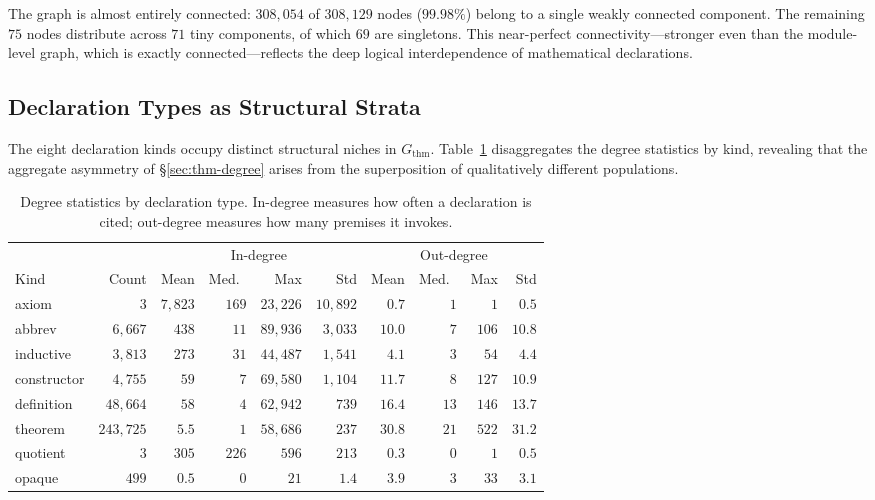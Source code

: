 The graph is almost entirely connected: $308{,}054$ of $308{,}129$ nodes ($99.98\%$) belong to a single weakly connected component. The remaining $75$ nodes distribute across $71$ tiny components, of which $69$ are singletons. This near-perfect connectivity---stronger even than the module-level graph, which is exactly connected---reflects the deep logical interdependence of mathematical declarations.

\subsection{Declaration Types as Structural Strata}
\label{sec:thm-types}

The eight declaration kinds occupy distinct structural niches in $G_{\mathrm{thm}}$. Table~\ref{tab:thm-kind-degree} disaggregates the degree statistics by kind, revealing that the aggregate asymmetry of \S\ref{sec:thm-degree} arises from the superposition of qualitatively different populations.

\begin{table}[ht]
\centering
\caption{Degree statistics by declaration type. In-degree measures how often a declaration is cited; out-degree measures how many premises it invokes.}
\label{tab:thm-kind-degree}
\small
\begin{tabular}{lrrrrrrrrr}
\toprule
& & \multicolumn{4}{c}{In-degree} & \multicolumn{4}{c}{Out-degree} \\
\cmidrule(lr){3-6} \cmidrule(lr){7-10}
Kind & Count & Mean & Med.\ & Max & Std & Mean & Med.\ & Max & Std \\
\midrule
axiom       & $3$       & $7{,}823$ & $169$ & $23{,}226$ & $10{,}892$ & $0.7$ & $1$ & $1$ & $0.5$ \\
abbrev      & $6{,}667$ & $438$     & $11$  & $89{,}936$ & $3{,}033$  & $10.0$ & $7$ & $106$ & $10.8$ \\
inductive   & $3{,}813$ & $273$     & $31$  & $44{,}487$ & $1{,}541$  & $4.1$ & $3$ & $54$ & $4.4$ \\
constructor & $4{,}755$ & $59$      & $7$   & $69{,}580$ & $1{,}104$  & $11.7$ & $8$ & $127$ & $10.9$ \\
definition  & $48{,}664$& $58$      & $4$   & $62{,}942$ & $739$      & $16.4$ & $13$ & $146$ & $13.7$ \\
theorem     & $243{,}725$& $5.5$   & $1$   & $58{,}686$ & $237$      & $30.8$ & $21$ & $522$ & $31.2$ \\
quotient    & $3$       & $305$     & $226$ & $596$      & $213$      & $0.3$ & $0$ & $1$ & $0.5$ \\
opaque      & $499$     & $0.5$     & $0$   & $21$       & $1.4$      & $3.9$ & $3$ & $33$ & $3.1$ \\
\bottomrule
\end{tabular}
\end{table}

